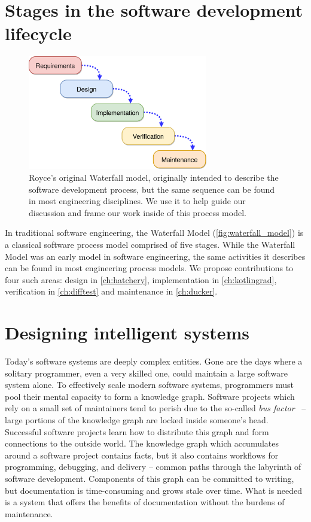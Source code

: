\documentclass[12pt,initial,twoside,maitrise]{dms}
\numberwithin{equation}{section}
\numberwithin{table}{chapter}
\numberwithin{figure}{chapter}
\begin{document}
\section{Stages in the software development lifecycle}\label{sec:sldc-stages}

\begin{figure}
    \centering
    \includegraphics[width=0.70\textwidth]{waterfall_diagram.png}
    \caption{Royce's original Waterfall model, originally intended to describe the software development process, but the same sequence can be found in most engineering disciplines. We use it to help guide our discussion and frame our work inside of this process model.\vspace{-10pt}}
    \label{fig:waterfall_model}
\end{figure}

In traditional software engineering, the Waterfall Model (\autoref{fig:waterfall_model}) is a classical software process model comprised of five stages. While the Waterfall Model was an early model in software engineering, the same activities it describes can be found in most engineering process models. We propose contributions to four such areas: design in \autoref{ch:hatchery}, implementation in \autoref{ch:kotlingrad}, verification in \autoref{ch:difftest} and maintenance in \autoref{ch:ducker}.

\section{Designing intelligent systems}

Today's software systems are deeply complex entities. Gone are the days where a solitary programmer, even a very skilled one, could maintain a large software system alone. To effectively scale modern software systems, programmers must pool their mental capacity to form a knowledge graph. Software projects which rely on a small set of maintainers tend to perish due to the so-called \textit{bus factor}~\citep{cosentino2015assessing} -- large portions of the knowledge graph are locked inside someone's head. Successful software projects learn how to distribute this graph and form connections to the outside world. The knowledge graph which accumulates around a software project contains facts, but it also contains workflows for programming, debugging, and delivery -- common paths through the labyrinth of software development. Components of this graph can be committed to writing, but documentation is time-consuming and grows stale over time. What is needed is a system that offers the benefits of documentation without the burdens of maintenance.
\end{document}
